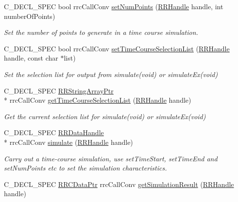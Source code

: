 \begin{DoxyCompactItemize}
C\-\_\-\-D\-E\-C\-L\-\_\-\-S\-P\-E\-C bool rrc\-Call\-Conv \hyperlink{group__simulation_ga4575f315d9794b53adf78bfb60973d58}{set\-Num\-Points} (\hyperlink{rrc__types_8h_a1d68f0592372208fa5a5f2799ea4b3ae}{R\-R\-Handle} handle, int number\-Of\-Points)
\begin{DoxyCompactList}\small\item\em Set the number of points to generate in a time course simulation. \end{DoxyCompactList}\item 
C\-\_\-\-D\-E\-C\-L\-\_\-\-S\-P\-E\-C bool rrc\-Call\-Conv \hyperlink{group__simulation_ga61cca45bb48776d12f5bcc52d0c77e04}{set\-Time\-Course\-Selection\-List} (\hyperlink{rrc__types_8h_a1d68f0592372208fa5a5f2799ea4b3ae}{R\-R\-Handle} handle, const char $\ast$list)
\begin{DoxyCompactList}\small\item\em Set the selection list for output from simulate(void) or simulate\-Ex(void) \end{DoxyCompactList}\item 
C\-\_\-\-D\-E\-C\-L\-\_\-\-S\-P\-E\-C \hyperlink{rrc__types_8h_a7c9475df6c7337d99482b13a365e7596}{R\-R\-String\-Array\-Ptr} \\*
rrc\-Call\-Conv \hyperlink{group__simulation_gab58d3101cad36a26f0d421e64cf0d0f6}{get\-Time\-Course\-Selection\-List} (\hyperlink{rrc__types_8h_a1d68f0592372208fa5a5f2799ea4b3ae}{R\-R\-Handle} handle)
\begin{DoxyCompactList}\small\item\em Get the current selection list for simulate(void) or simulate\-Ex(void) \end{DoxyCompactList}\item 
C\-\_\-\-D\-E\-C\-L\-\_\-\-S\-P\-E\-C \hyperlink{rrc__types_8h_ad0beb6fbdd576789fab9cead01d8b9e9}{R\-R\-Data\-Handle} \\*
rrc\-Call\-Conv \hyperlink{group__simulation_gabbfb1f6f19c777c59fccf8c453c874f7}{simulate} (\hyperlink{rrc__types_8h_a1d68f0592372208fa5a5f2799ea4b3ae}{R\-R\-Handle} handle)
\begin{DoxyCompactList}\small\item\em Carry out a time-\/course simulation, use set\-Time\-Start, set\-Time\-End and set\-Num\-Points etc to set the simulation characteristics. \end{DoxyCompactList}\item 
C\-\_\-\-D\-E\-C\-L\-\_\-\-S\-P\-E\-C \hyperlink{rrc__types_8h_a9da8b124eb9c3c0045f8926c6a420b4a}{R\-R\-C\-Data\-Ptr} rrc\-Call\-Conv \hyperlink{group__simulation_gaa52283eaebe340a4a39cc4900441be93}{get\-Simulation\-Result} (\hyperlink{rrc__types_8h_a1d68f0592372208fa5a5f2799ea4b3ae}{R\-R\-Handle} handle)

\end{DoxyCompactItemize}
